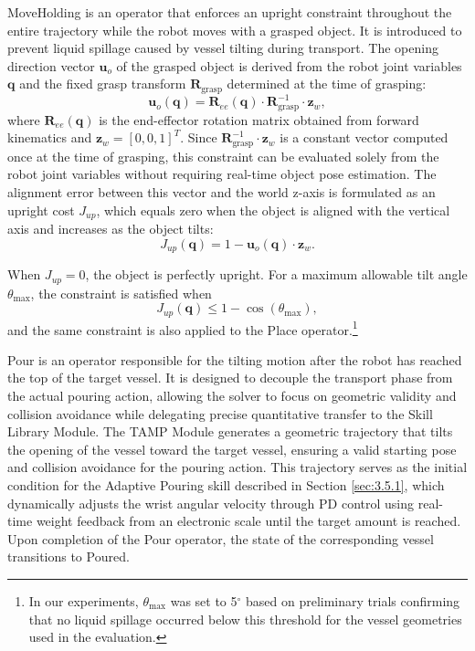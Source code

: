 \documentclass{ieeeaccess}
\begin{document}
MoveHolding is an operator that enforces an upright constraint throughout the entire trajectory while the robot moves with a grasped object. It is introduced to prevent liquid spillage caused by vessel tilting during transport. The opening direction vector $\mathbf{u}_{o}$ of the grasped object is derived from the robot joint variables $\mathbf{q}$ and the fixed grasp transform $\mathbf{R}_{\text{grasp}}$ determined at the time of grasping:
\begin{equation}
\mathbf{u}_{o}(\mathbf{q}) = \mathbf{R}_{ee}(\mathbf{q}) \cdot \mathbf{R}_{\text{grasp}}^{-1} \cdot \mathbf{z}_{w},
\end{equation}
where $\mathbf{R}_{ee}(\mathbf{q})$ is the end-effector rotation matrix obtained from forward kinematics and $\mathbf{z}_{w} = [0, 0, 1]^T$. Since $\mathbf{R}_{\text{grasp}}^{-1} \cdot \mathbf{z}_{w}$ is a constant vector computed once at the time of grasping, this constraint can be evaluated solely from the robot joint variables without requiring real-time object pose estimation. The alignment error between this vector and the world z-axis is formulated as an upright cost $J_{up}$, which equals zero when the object is aligned with the vertical axis and increases as the object tilts:
\begin{equation}
J_{up}(\mathbf{q}) = 1 - \mathbf{u}_{o}(\mathbf{q}) \cdot \mathbf{z}_{w}.
\end{equation}

When $J_{up} = 0$, the object is perfectly upright. For a maximum allowable tilt angle $\theta_{\max}$, the constraint is satisfied when
\begin{equation}
J_{up}(\mathbf{q}) \leq 1 - \cos(\theta_{\max}),
\end{equation}
and the same constraint is also applied to the Place operator.\footnote{In our experiments, $\theta_{\max}$ was set to 5$^\circ$ based on preliminary trials confirming that no liquid spillage occurred below this threshold for the vessel geometries used in the evaluation.}

Pour is an operator responsible for the tilting motion after the robot has reached the top of the target vessel. It is designed to decouple the transport phase from the actual pouring action, allowing the solver to focus on geometric validity and collision avoidance while delegating precise quantitative transfer to the Skill Library Module. The TAMP Module generates a geometric trajectory that tilts the opening of the vessel toward the target vessel, ensuring a valid starting pose and collision avoidance for the pouring action. This trajectory serves as the initial condition for the Adaptive Pouring skill described in Section \ref{sec:3.5.1}, which dynamically adjusts the wrist angular velocity through PD control using real-time weight feedback from an electronic scale until the target amount is reached. Upon completion of the Pour operator, the state of the corresponding vessel transitions to Poured.
\end{document}
